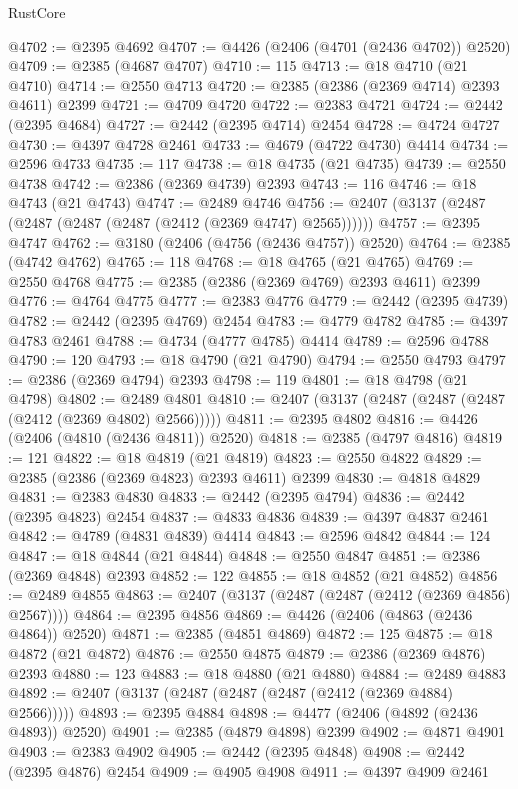 \begin{lexlean}{RustCore}
\begin{coremodule}
@4702 := @2395 @4692
@4707 := @4426 (@2406 (@4701 (@2436 @4702)) @2520)
@4709 := @2385 (@4687 @4707)
@4710 := 115
@4713 := @18 @4710 (@21 @4710)
@4714 := @2550 @4713
@4720 := @2385 (@2386 (@2369 @4714) @2393 @4611) @2399
@4721 := @4709 @4720
@4722 := @2383 @4721
@4724 := @2442 (@2395 @4684)
@4727 := @2442 (@2395 @4714) @2454
@4728 := @4724 @4727
@4730 := @4397 @4728 @2461
@4733 := @4679 (@4722 @4730) @4414
@4734 := @2596 @4733
@4735 := 117
@4738 := @18 @4735 (@21 @4735)
@4739 := @2550 @4738
@4742 := @2386 (@2369 @4739) @2393
@4743 := 116
@4746 := @18 @4743 (@21 @4743)
@4747 := @2489 @4746
@4756 := @2407 (@3137 (@2487 (@2487 (@2487 (@2487 (@2412 (@2369 @4747) @2565))))))
@4757 := @2395 @4747
@4762 := @3180 (@2406 (@4756 (@2436 @4757)) @2520)
@4764 := @2385 (@4742 @4762)
@4765 := 118
@4768 := @18 @4765 (@21 @4765)
@4769 := @2550 @4768
@4775 := @2385 (@2386 (@2369 @4769) @2393 @4611) @2399
@4776 := @4764 @4775
@4777 := @2383 @4776
@4779 := @2442 (@2395 @4739)
@4782 := @2442 (@2395 @4769) @2454
@4783 := @4779 @4782
@4785 := @4397 @4783 @2461
@4788 := @4734 (@4777 @4785) @4414
@4789 := @2596 @4788
@4790 := 120
@4793 := @18 @4790 (@21 @4790)
@4794 := @2550 @4793
@4797 := @2386 (@2369 @4794) @2393
@4798 := 119
@4801 := @18 @4798 (@21 @4798)
@4802 := @2489 @4801
@4810 := @2407 (@3137 (@2487 (@2487 (@2487 (@2412 (@2369 @4802) @2566)))))
@4811 := @2395 @4802
@4816 := @4426 (@2406 (@4810 (@2436 @4811)) @2520)
@4818 := @2385 (@4797 @4816)
@4819 := 121
@4822 := @18 @4819 (@21 @4819)
@4823 := @2550 @4822
@4829 := @2385 (@2386 (@2369 @4823) @2393 @4611) @2399
@4830 := @4818 @4829
@4831 := @2383 @4830
@4833 := @2442 (@2395 @4794)
@4836 := @2442 (@2395 @4823) @2454
@4837 := @4833 @4836
@4839 := @4397 @4837 @2461
@4842 := @4789 (@4831 @4839) @4414
@4843 := @2596 @4842
@4844 := 124
@4847 := @18 @4844 (@21 @4844)
@4848 := @2550 @4847
@4851 := @2386 (@2369 @4848) @2393
@4852 := 122
@4855 := @18 @4852 (@21 @4852)
@4856 := @2489 @4855
@4863 := @2407 (@3137 (@2487 (@2487 (@2412 (@2369 @4856) @2567))))
@4864 := @2395 @4856
@4869 := @4426 (@2406 (@4863 (@2436 @4864)) @2520)
@4871 := @2385 (@4851 @4869)
@4872 := 125
@4875 := @18 @4872 (@21 @4872)
@4876 := @2550 @4875
@4879 := @2386 (@2369 @4876) @2393
@4880 := 123
@4883 := @18 @4880 (@21 @4880)
@4884 := @2489 @4883
@4892 := @2407 (@3137 (@2487 (@2487 (@2487 (@2412 (@2369 @4884) @2566)))))
@4893 := @2395 @4884
@4898 := @4477 (@2406 (@4892 (@2436 @4893)) @2520)
@4901 := @2385 (@4879 @4898) @2399
@4902 := @4871 @4901
@4903 := @2383 @4902
@4905 := @2442 (@2395 @4848)
@4908 := @2442 (@2395 @4876) @2454
@4909 := @4905 @4908
@4911 := @4397 @4909 @2461

\end{coremodule}
\end{lexlean}
